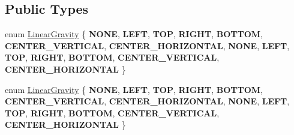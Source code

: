 \subsection*{Public Types}
\begin{DoxyCompactItemize}
\item 
enum \hyperlink{classui_1_1LinearLayoutParameter_a2045fd6c06860357e95bccdf2531fe08}{Linear\+Gravity} \{ \newline
{\bfseries N\+O\+NE}, 
{\bfseries L\+E\+FT}, 
{\bfseries T\+OP}, 
{\bfseries R\+I\+G\+HT}, 
\newline
{\bfseries B\+O\+T\+T\+OM}, 
{\bfseries C\+E\+N\+T\+E\+R\+\_\+\+V\+E\+R\+T\+I\+C\+AL}, 
{\bfseries C\+E\+N\+T\+E\+R\+\_\+\+H\+O\+R\+I\+Z\+O\+N\+T\+AL}, 
{\bfseries N\+O\+NE}, 
\newline
{\bfseries L\+E\+FT}, 
{\bfseries T\+OP}, 
{\bfseries R\+I\+G\+HT}, 
{\bfseries B\+O\+T\+T\+OM}, 
\newline
{\bfseries C\+E\+N\+T\+E\+R\+\_\+\+V\+E\+R\+T\+I\+C\+AL}, 
{\bfseries C\+E\+N\+T\+E\+R\+\_\+\+H\+O\+R\+I\+Z\+O\+N\+T\+AL}
 \}
\item 
enum \hyperlink{classui_1_1LinearLayoutParameter_a2045fd6c06860357e95bccdf2531fe08}{Linear\+Gravity} \{ \newline
{\bfseries N\+O\+NE}, 
{\bfseries L\+E\+FT}, 
{\bfseries T\+OP}, 
{\bfseries R\+I\+G\+HT}, 
\newline
{\bfseries B\+O\+T\+T\+OM}, 
{\bfseries C\+E\+N\+T\+E\+R\+\_\+\+V\+E\+R\+T\+I\+C\+AL}, 
{\bfseries C\+E\+N\+T\+E\+R\+\_\+\+H\+O\+R\+I\+Z\+O\+N\+T\+AL}, 
{\bfseries N\+O\+NE}, 
\newline
{\bfseries L\+E\+FT}, 
{\bfseries T\+OP}, 
{\bfseries R\+I\+G\+HT}, 
{\bfseries B\+O\+T\+T\+OM}, 
\newline
{\bfseries C\+E\+N\+T\+E\+R\+\_\+\+V\+E\+R\+T\+I\+C\+AL}, 
{\bfseries C\+E\+N\+T\+E\+R\+\_\+\+H\+O\+R\+I\+Z\+O\+N\+T\+AL}
 \}
\end{DoxyCompactItemize}
